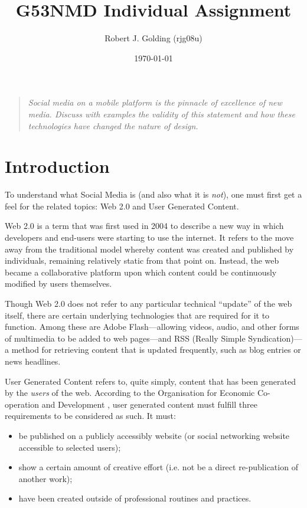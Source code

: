 \documentclass[a4paper,11pt]{article}
\title{G53NMD Individual Assignment}
\author{Robert J. Golding (rjg08u)} \date{\today}
\begin{document}
    \maketitle

    \begin{quote}
        \emph{Social media on a mobile platform is the pinnacle of excellence
        of new media. Discuss with examples the validity of this statement and
        how these technologies have changed the nature of design.}
    \end{quote}

    \section{Introduction}

    To understand what Social Media is (and also what it is \emph{not}), one
    must first get a feel for the related topics: Web 2.0 and User Generated
    Content. \cite{kaplan2010}

    Web 2.0 is a term that was first used in 2004 to describe a new way in
    which developers and end-users were starting to use the internet. It refers
    to the move away from the traditional model whereby content was created and
    published by individuals, remaining relatively static from that point on.
    Instead, the web became a collaborative platform upon which content could
    be continuously modified by users themselves.

    Though Web 2.0 does not refer to any particular technical ``update'' of the
    web itself, there are certain underlying technologies that are required for
    it to function. Among these are Adobe Flash---allowing videos, audio, and
    other forms of multimedia to be added to web pages---and RSS (Really Simple
    Syndication)---a method for retrieving content that is updated frequently,
    such as blog entries or news headlines.

    User Generated Content refers to, quite simply, content that has been
    generated by the \emph{users} of the web. According to the Organisation for
    Economic Co-operation and Development \cite{vickery2007}, user generated
    content must fulfill three requirements to be considered as such. It must:

    \begin{itemize}
        \item be published on a publicly accessibly website (or social
            networking website accessible to selected users);
        \item show a certain amount of creative effort (i.e. not be a direct
            re-publication of another work);
        \item have been created outside of professional routines and practices.
    \end{itemize}
\end{document}
